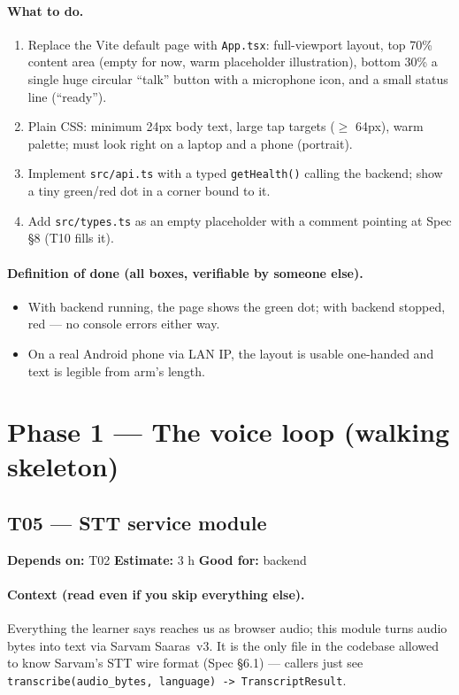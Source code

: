 \documentclass[11pt]{article}
\newcommand{\code}[1]{\texttt{#1}}
\newcommand{\taskmeta}[3]{\noindent\textbf{Depends on:} #1 \quad\textbullet\quad \textbf{Estimate:} #2 \quad\textbullet\quad \textbf{Good for:} #3\par\vspace{2pt}}
\newcommand{\ctx}[1]{\paragraph{Context (read even if you skip everything else).} #1}
\newcommand{\dod}{\paragraph{Definition of done (all boxes, verifiable by someone else).}}
\begin{document}
\paragraph{What to do.}
\begin{enumerate}
  \item Replace the Vite default page with \code{App.tsx}: full-viewport layout, top 70\% content area (empty for now, warm placeholder illustration), bottom 30\% a single huge circular ``talk'' button with a microphone icon, and a small status line (``ready'').
  \item Plain CSS: minimum 24px body text, large tap targets ($\geq$ 64px), warm palette; must look right on a laptop and a phone (portrait).
  \item Implement \code{src/api.ts} with a typed \code{getHealth()} calling the backend; show a tiny green/red dot in a corner bound to it.
  \item Add \code{src/types.ts} as an empty placeholder with a comment pointing at Spec \S8 (T10 fills it).
\end{enumerate}
\dod
\begin{itemize}
  \item With backend running, the page shows the green dot; with backend stopped, red --- no console errors either way.
  \item On a real Android phone via LAN IP, the layout is usable one-handed and text is legible from arm's length.
\end{itemize}

\section{Phase 1 --- The voice loop (walking skeleton)}

\subsection{T05 --- STT service module \dag}
\taskmeta{T02}{3 h}{backend}
\ctx{Everything the learner says reaches us as browser audio; this module turns audio bytes into text via Sarvam Saaras~v3. It is the only file in the codebase allowed to know Sarvam's STT wire format (Spec \S6.1) --- callers just see \code{transcribe(audio\_bytes, language) -> TranscriptResult}.}
\end{document}
